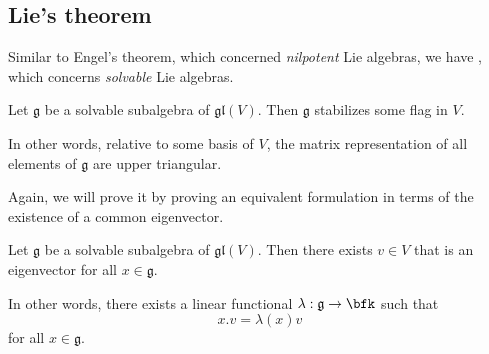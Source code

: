 \documentclass{article}
\newcommand*\frkg{{\ensuremath{\mathfrak{g}}}}
\newcommand*\glalg{\ensuremath{\mathfrak{gl}}}
\newcommand*\acts{.}
\begin{document}
\subsection{Lie's theorem}

Similar to Engel's theorem, which concerned \textit{nilpotent} Lie algebras, we have , which concerns \textit{solvable} Lie algebras.

\begin{theorem}
    Let $\frkg$ be a solvable subalgebra of $\glalg(V)$.
    Then $\frkg$ stabilizes some flag in $V$.
\end{theorem}

In other words, relative to some basis of $V$, the matrix representation of all elements of $\frkg$ are upper triangular.

Again, we will prove it by proving an equivalent formulation in terms of the existence of a common eigenvector.

\begin{theorem}
    Let $\frkg$ be a solvable subalgebra of $\glalg(V)$.
    Then there exists $v \in V$ that is an eigenvector for all $x \in \frkg$.

    In other words, there exists a linear functional $\lambda: \frkg \to \bfk$ such that 
    \[
        x \acts v
        =
        \lambda(x)v
    \]
    for all $x \in \frkg$.
\end{theorem}
\end{document}
